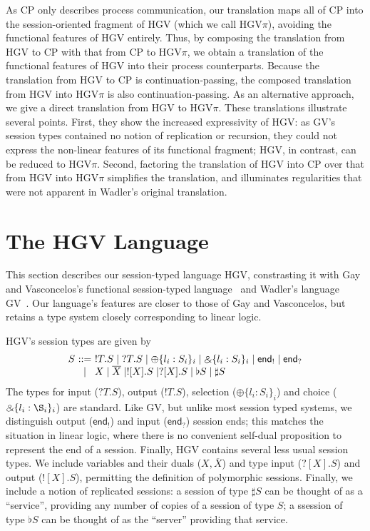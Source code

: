 \documentclass{easychair}
\makeatletter
\newcommand{\ba}{\begin{array}}
\newcommand{\ea}{\end{array}}
\newenvironment{equations}{\[\ba{@{}r@{~}c@{~}l@{}}}{\ea\]}
\newcommand{\key}{\mathsf}
\newcommand{\set}[1]{\{ #1 \}}
\newcommand{\row}[2]{\set{#1}_{#2}}
\newcommand{\gvOutput}[2]{\mathord{!}{#1}.{#2}}
\newcommand{\gvInput}[2]{\mathord{?}{#1}.{#2}}
\newcommand{\gvEndOutput}{\key{end}_!}
\newcommand{\gvEndInput}{\key{end}_?}
\newcommand{\gvPlus}[2]{\oplus \row{#1}{#2}}
\newcommand{\gvChoice}[2]{\binampersand \row{#1}{#2}}
\newcommand{\gvServer}[1]{\flat {#1}}
\newcommand{\gvService}[1]{\sharp {#1}}
\newcommand{\gvDual}[1]{\overline{#1}}
\newcommand{\gvOutputType}[2]{![{#1}].{#2}}
\newcommand{\gvInputType}[2]{?[{#1}].{#2}}
\newcommand{\la}{l}
\newcommand{\hgv}{HGV\xspace}
\newcommand{\hgvpi}{HGV$\pi$\xspace}
\makeatother
\begin{document}
As CP only describes process communication, our translation maps all of CP into the session-oriented
fragment of HGV (which we call \hgvpi), avoiding the functional features of \hgv entirely.  Thus, by
composing the translation from \hgv to CP with that from CP to \hgvpi, we obtain a translation of
the functional features of \hgv into their process counterparts.  Because the translation from \hgv
to CP is continuation-passing, the composed translation from \hgv into \hgvpi is also
continuation-passing.  As an alternative approach, we give a direct translation from \hgv to \hgvpi.
These translations illustrate several points.  First, they show the increased expressivity of \hgv:
as GV's session types contained no notion of replication or recursion, they could not express the
non-linear features of its functional fragment; \hgv, in contrast, can be reduced to \hgvpi.
Second, factoring the translation of \hgv into CP over that from \hgv into \hgvpi simplifies the
translation, and illuminates regularities that were not apparent in Wadler's original translation.

\section{The \hgv Language}

This section describes our session-typed language \hgv, constrasting it with Gay and Vasconcelos's
functional session-typed language~\cite{GayVasconcelos10} and Wadler's language GV~\cite{Wadler12}.
Our language's features are closer to those of Gay and Vasconcelos, but retains a type system
closely corresponding to linear logic.

\hgv's session types are given by
\begin{equations}
  S & ::= & \gvOutput{T}{S} \mid \gvInput{T}{S} \mid
           \gvPlus{\la_i:S_i}{i} \mid \gvChoice{\la_i:S_i}{i} \mid
           \gvEndOutput \mid \gvEndInput \\
    & \mid & X \mid \gvDual{X} \mid
            \gvOutputType{X}{S} \mid \gvInputType{X}{S} \mid
            \gvServer{S} \mid \gvService{S}
\end{equations}
The types for input ($\gvInput{T}{S}$), output ($\gvOutput{T}{S}$), selection
($\gvPlus{\la_i:S_i}{i}$) and choice ($\gvChoice{\la_i:\S_i}{i}$) are standard.  Like GV, but unlike
most session typed systems, we distinguish output ($\gvEndOutput$) and input ($\gvEndInput$) session
ends; this matches the situation in linear logic, where there is no convenient self-dual proposition
to represent the end of a session.  Finally, \hgv contains several less usual session types.  We
include variables and their duals ($X,\gvDual{X}$) and type input ($\gvInputType{X}{S}$) and output
($\gvOutputType{X}{S}$), permitting the definition of polymorphic sessions.  Finally, we include a
notion of replicated sessions: a session of type $\gvService{S}$ can be thought of as a ``service'',
providing any number of copies of a session of type $S$; a ssession of type $\gvServer{S}$ can be
thought of as the ``server'' providing that service.
\end{document}
